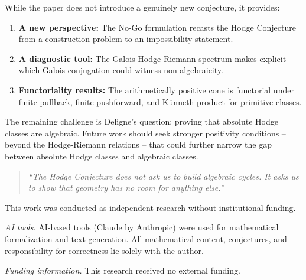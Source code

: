 \documentclass[aps,prd,twocolumn,superscriptaddress,nofootinbib]{revtex4-2}
\theoremstyle{definition}
\theoremstyle{remark}
\begin{document}
While the paper does not introduce a genuinely new conjecture, it provides:

\begin{enumerate}
\item \textbf{A new perspective:} The No-Go formulation recasts the Hodge Conjecture from a construction problem to an impossibility statement.

\item \textbf{A diagnostic tool:} The Galois-Hodge-Riemann spectrum makes explicit which Galois conjugation could witness non-algebraicity.

\item \textbf{Functoriality results:} The arithmetically positive cone is functorial under finite pullback, finite pushforward, and K\"unneth product for primitive classes.
\end{enumerate}

The remaining challenge is Deligne's question: proving that absolute Hodge classes are algebraic. Future work should seek stronger positivity conditions -- beyond the Hodge-Riemann relations -- that could further narrow the gap between absolute Hodge classes and algebraic classes.

\begin{quote}
\textit{``The Hodge Conjecture does not ask us to build algebraic cycles. It asks us to show that geometry has no room for anything else.''}
\end{quote}


\begin{acknowledgments}
This work was conducted as independent research without institutional funding.

\textit{AI tools.} AI-based tools (Claude by Anthropic) were used for mathematical formalization and text generation. All mathematical content, conjectures, and responsibility for correctness lie solely with the author.

\textit{Funding information.} This research received no external funding.
\end{acknowledgments}
\end{document}
